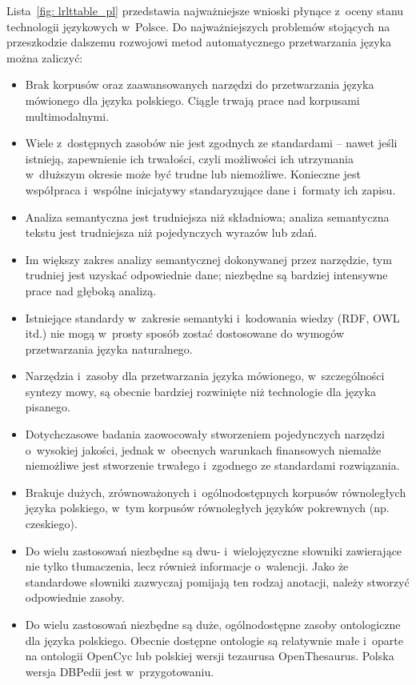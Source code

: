\begin{multicols}{2}
Lista~\ref{fig: lrlttable_pl} przedstawia najważniejsze wnioski
płynące z~oceny stanu technologii językowych w~Polsce. Do
najważniejszych problemów stojących na przeszkodzie dalszemu
rozwojowi metod automatycznego przetwarzania języka można zaliczyć: 

\begin{itemize} \item Brak korpusów oraz zaawansowanych narzędzi do
przetwarzania języka mówionego dla języka polskiego. Ciągle
trwają prace nad korpusami multimodalnymi. \item Wiele z~dostępnych
zasobów nie jest zgodnych ze standardami – nawet jeśli istnieją,
zapewnienie ich trwałości, czyli możliwości ich utrzymania
w~dłuższym okresie może być trudne lub niemożliwe. Konieczne jest
współpraca i~wspólne inicjatywy standaryzujące dane i~formaty ich
zapisu. \item Analiza semantyczna jest trudniejsza niż składniowa;
analiza semantyczna tekstu jest trudniejsza niż pojedynczych wyrazów
lub zdań. \item Im większy zakres analizy semantycznej dokonywanej
przez narzędzie, tym trudniej jest uzyskać odpowiednie dane;
niezbędne są bardziej intensywne prace nad głęboką analizą.
\item Istniejące standardy w~zakresie semantyki i~kodowania wiedzy
(RDF, OWL itd.) nie mogą w~prosty sposób zostać dostosowane do
wymogów przetwarzania języka naturalnego. \item Narzędzia i~zasoby
dla przetwarzania języka mówionego, w~szczególności syntezy mowy,
są obecnie bardziej rozwinięte niż technologie dla języka
pisanego. \item Dotychczasowe badania zaowocowały stworzeniem
pojedynczych narzędzi o~wysokiej jakości, jednak w~obecnych
warunkach finansowych niemalże niemożliwe jest stworzenie trwałego
i~zgodnego ze standardami rozwiązania. \end{itemize} 

\begin{itemize} \item Brakuje dużych, zrównoważonych
i~ogólnodostępnych korpusów równoległych języka polskiego, w~tym
korpusów równoległych języków pokrewnych (np. czeskiego). \item
Do wielu zastosowań niezbędne są dwu- i~wielojęzyczne słowniki
zawierające nie tylko tłumaczenia, lecz również informacje
o~walencji. Jako że standardowe słowniki zazwyczaj pomijają ten
rodzaj anotacji, należy stworzyć odpowiednie zasoby. \item Do wielu
zastosowań niezbędne są duże, ogólnodostępne zasoby ontologiczne
dla języka polskiego. Obecnie dostępne ontologie są relatywnie
małe i~oparte na ontologii OpenCyc lub polskiej wersji tezaurusa
OpenThesaurus. Polska wersja DBPedii jest w~przygotowaniu.
\end{itemize} 


\end{multicols}
